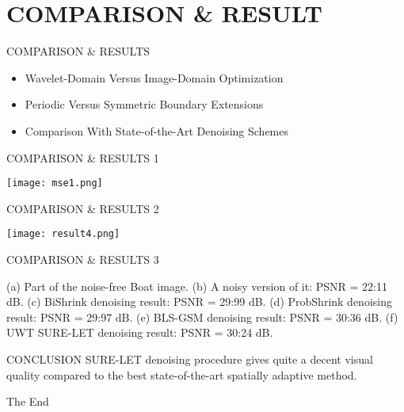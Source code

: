 \documentclass{beamer}
\begin{document}
\section{COMPARISON \& RESULT}	
	
	
	\begin{frame}{COMPARISON \& RESULTS}
	\begin{itemize}
		\item  Wavelet-Domain Versus Image-Domain Optimization
		\item Periodic Versus Symmetric Boundary Extensions
		\item Comparison With State-of-the-Art Denoising Schemes
	\end{itemize}
	
	
\end{frame}



	\begin{frame}{COMPARISON \& RESULTS 1}
	\begin{center}
		\texttt{[image: mse1.png]}
	\end{center}
\end{frame}

	
\begin{frame}{COMPARISON \& RESULTS 2}
\begin{center}
	\texttt{[image: result4.png]}
\end{center}

\end{frame}


	
	
	\begin{frame}{COMPARISON \& RESULTS 3}
	
		(a) Part of the noise-free Boat image. (b) A noisy version of it: PSNR =
	22:11 dB. (c) BiShrink denoising result: PSNR = 29:99 dB. (d) ProbShrink
	denoising result: PSNR = 29:97 dB. (e) BLS-GSM denoising result: PSNR =
	30:36 dB. (f) UWT SURE-LET denoising result: PSNR = 30:24 dB.
	
\end{frame}	
\begin{frame}{CONCLUSION}
SURE-LET denoising procedure gives quite a decent visual quality compared to the best state-of-the-art spatially adaptive method.
\end{frame}

	
	
	
	
	
	
	
	
	
	
	
	
	
	
	
	
	
	
	
	
	
	
	
	
	
	
	
	
	
	\begin{frame}
		\Huge{\centerline{The End}}
	\end{frame}
	
	
\end{document}
